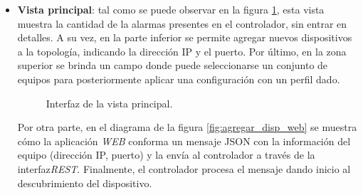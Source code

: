   \begin{itemize}
	\item \textbf{Vista principal}: tal como se puede observar en la figura \ref{fig:captura_web_principal}, esta vista muestra la cantidad de la alarmas presentes en el controlador, sin entrar en detalles. A su vez, en la parte inferior se permite agregar nuevos dispositivos a la topología, indicando la dirección IP y el puerto. Por último, en la zona superior se brinda un campo donde puede seleccionarse un conjunto de equipos para posteriormente aplicar una configuración con un perfil dado. 

    \begin{figure}[H]
        \centering
        \caption{Interfaz de la vista principal.}
        \label{fig:captura_web_principal}
      \end{figure}

    Por otra parte, en el diagrama de la figura \ref{fig:agregar_disp_web} se muestra cómo la aplicación \textit{WEB} conforma un mensaje JSON con la información del equipo (dirección IP, puerto) y la envía al controlador a través de la interfaz\textit{REST}. Finalmente, el controlador procesa el mensaje dando inicio al descubrimiento del dispositivo. 


\end{itemize}
